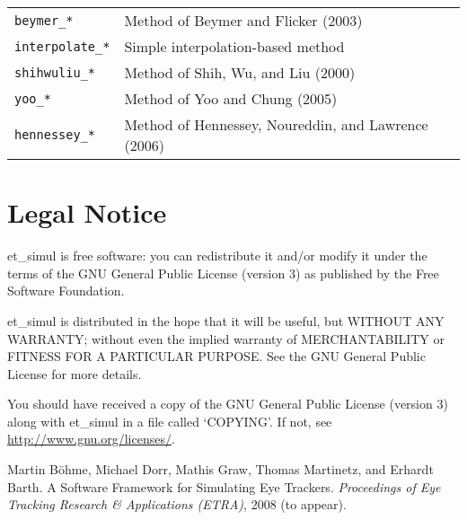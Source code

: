 \documentclass{scrartcl}
\begin{document}
\begin{longtable}{p{4cm}p{9.2cm}}
\texttt{beymer\_*} & Method of Beymer and Flicker (2003) \\
\texttt{interpolate\_*} & Simple interpolation-based method \\
\texttt{shihwuliu\_*} & Method of Shih, Wu, and Liu (2000) \\
\texttt{yoo\_*} & Method of Yoo and Chung (2005) \\
\texttt{hennessey\_*} & Method of Hennessey, Noureddin, and Lawrence (2006)
\end{longtable}

\section{Legal Notice}

et\_simul is free software: you can redistribute it and/or modify
it under the terms of the GNU General Public License (version 3) as
published by the Free Software Foundation.

et\_simul is distributed in the hope that it will be useful,
but WITHOUT ANY WARRANTY; without even the implied warranty of
MERCHANTABILITY or FITNESS FOR A PARTICULAR PURPOSE.  See the
GNU General Public License for more details.

You should have received a copy of the GNU General Public License
(version 3) along with et\_simul in a file called `COPYING'. If not, see
\url{http://www.gnu.org/licenses/}.


\begin{thebibliography}{[1]}
Martin B{\"o}hme, Michael Dorr, Mathis Graw, Thomas
Martinetz, and Erhardt Barth. A Software Framework for Simulating Eye
Trackers. \emph{Proceedings of Eye Tracking Research \& Applications (ETRA)},
2008 (to appear).
\end{thebibliography}
\end{document}
